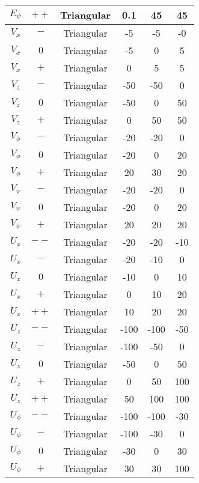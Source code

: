 \begin{center}
\begin{longtable}{|c|c|c|c|c|c|}
        $E_{\psi}$ & $++$ & Triangular & 0.1 & 45 & 45 \\
        \hline
        $V_x$ & $-$ & Triangular & -5 & -5 & -0 \\
        $V_x$ & $0$  & Triangular & -5 & 0 & 5 \\
        $V_x$ & $+$ & Triangular & 0 & 5 & 5 \\
        \hline
        $V_{z}$ & $-$  & Triangular & -50 & -50 & 0 \\
        $V_{z}$ & $0$  & Triangular & -50 & 0 & 50 \\
        $V_{z}$ & $+$  & Triangular & 0 & 50 & 50 \\
        \hline
        $V_{\phi}$ & $-$  & Triangular & -20 & -20 & 0 \\
        $V_{\phi}$ & $0$  & Triangular & -20 & 0 & 20 \\
        $V_{\phi}$ & $+$  & Triangular & 20 & 30 & 20 \\
        \hline
        $V_{\psi}$ & $-$  & Triangular & -20 & -20 & 0 \\
        $V_{\psi}$ & $0$  & Triangular & -20 & 0 & 20 \\
        $V_{\psi}$ & $+$  & Triangular & 20 & 20 & 20 \\
        \hline
        $U_x$ & $--$ & Triangular & -20 & -20 & -10 \\
        $U_x$ & $-$  & Triangular & -20 & -10 & 0 \\
        $U_x$ & $0$  & Triangular & -10 & 0 & 10 \\
        $U_x$ & $+$  & Triangular & 0 & 10 & 20 \\
        $U_x$ & $++$ & Triangular & 10 & 20 & 20 \\
        \hline
        $U_{z}$ & $--$ & Triangular & -100 & -100 & -50 \\
        $U_{z}$ & $-$  & Triangular & -100 & -50 & 0 \\
        $U_{z}$ & $0$  & Triangular & -50 & 0 & 50 \\
        $U_{z}$ & $+$  & Triangular & 0 & 50 & 100 \\
        $U_{z}$ & $++$ & Triangular & 50 & 100 & 100 \\
        \hline
        $U_{\phi}$ & $--$ & Triangular & -100 & -100 & -30 \\
        $U_{\phi}$ & $-$  & Triangular & -100 & -30 & 0 \\
        $U_{\phi}$ & $0$  & Triangular & -30 & 0 & 30 \\
        $U_{\phi}$ & $+$  & Triangular & 30 & 30 & 100 \\

\end{longtable}
\end{center}
